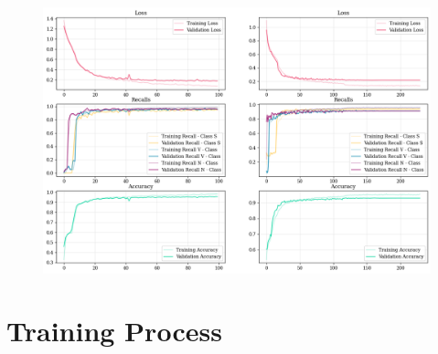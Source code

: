 \documentclass[conference]{IEEEtran}
\begin{document}


\newpage
\appendices
\begin{figure}
    \centering
    \includegraphics[width=\linewidth]{img/training.png}
    \caption{}
    \label{app:training}
\end{figure}
\section{Training Process}
\end{document}
